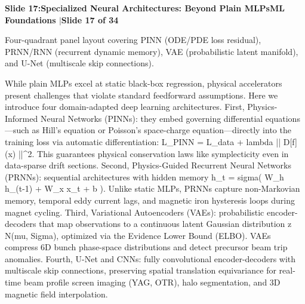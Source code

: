 \documentclass[11pt,a4paper]{article}
\begin{document}
\clearpage
\hypertarget{slide.17}{}
{}
\noindent\begin{tcolorbox}[colback=navy,colframe=navy,left=6pt,right=6pt,top=3pt,bottom=3pt,boxrule=0pt,arc=2pt]
{\large\bfseries\color{white}Slide 17:\enspace Specialized Neural Architectures: Beyond Plain MLPs}\hfill{\footnotesize\bfseries\color{white!85!lightbg}ML Foundations \enspace$|$\enspace Slide 17 of 34}
\end{tcolorbox}
\vspace{0.2em}
\begin{tcolorbox}[colback=lightbg,colframe=bordergray,title={\footnotesize\bfseries\color{darkgray}Slide Visual Blueprint},fontupper=\small,left=6pt,right=6pt,top=2.5pt,bottom=2.5pt,boxrule=0.6pt,arc=2.5pt]
Four-quadrant panel layout covering PINN (ODE/PDE loss residual), PRNN/RNN (recurrent dynamic memory), VAE (probabilistic latent manifold), and U-Net (multiscale skip connections).
\end{tcolorbox}
\vspace{0.2em}
\begin{tcolorbox}[colback=white,colframe=primaryblue,title={\footnotesize\bfseries\color{white}Spoken Presenter Script},fontupper=\small,left=6pt,right=6pt,top=3pt,bottom=3pt,boxrule=0.8pt,arc=2.5pt]
While plain MLPs excel at static black-box regression, physical accelerators present challenges that violate standard feedforward assumptions. Here we introduce four domain-adapted deep learning architectures. First, Physics-Informed Neural Networks (PINNs): they embed governing differential equations—such as Hill's equation or Poisson's space-charge equation—directly into the training loss via automatic differentiation: L\_PINN = L\_data + lambda || D[f](x) ||\textasciicircum{}2. This guarantees physical conservation laws like symplecticity even in data-sparse drift sections. Second, Physics-Guided Recurrent Neural Networks (PRNNs): sequential architectures with hidden memory h\_t = sigma( W\_h h\_(t-1) + W\_x x\_t + b ). Unlike static MLPs, PRNNs capture non-Markovian memory, temporal eddy current lags, and magnetic iron hysteresis loops during magnet cycling. Third, Variational Autoencoders (VAEs): probabilistic encoder-decoders that map observations to a continuous latent Gaussian distribution z ~ N(mu, Sigma), optimized via the Evidence Lower Bound (ELBO). VAEs compress 6D bunch phase-space distributions and detect precursor beam trip anomalies. Fourth, U-Net and CNNs: fully convolutional encoder-decoders with multiscale skip connections, preserving spatial translation equivariance for real-time beam profile screen imaging (YAG, OTR), halo segmentation, and 3D magnetic field interpolation.
\end{tcolorbox}
\end{document}
